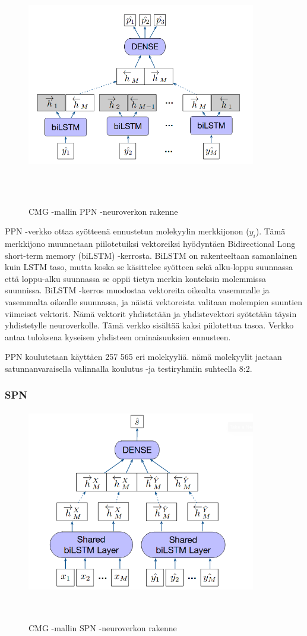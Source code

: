 \documentclass[finnish,twoside,censored,tkt,sw-line]{HYthesisML}
\begin{document}
\begin{figure}[ht]
    \centering
    \includegraphics[width=10cm, height=8cm]{cmg-property-prediction-network.png}
    \caption{CMG -mallin PPN -neuroverkon rakenne}
    {~\cite{ShinBonggun}}
\end{figure}

PPN -verkko ottaa syötteenä ennustetun molekyylin merkkijonon (\(y_i\)).
Tämä merkkijono muunnetaan piilotetuiksi vektoreiksi hyödyntäen Bidirectional Long short-term memory (biLSTM) -kerrosta.
BiLSTM on rakenteeltaan samanlainen kuin LSTM taso, mutta koska se käsittelee syötteen sekä alku-loppu suunnassa että loppu-alku suunnassa se oppii tietyn merkin konteksin molemmissa suunnissa.
BiLSTM -kerros muodostaa vektoreita oikealta vasemmalle ja vasemmalta oikealle suunnassa, ja näistä vektoreista valitaan molempien suuntien viimeiset vektorit.
Nämä vektorit yhdistetään ja yhdistevektori syötetään täysin yhdistetylle neuroverkolle.
Tämä verkko sisältää kaksi piilotettua tasoa.
Verkko antaa tuloksena kyseisen yhdisteen ominaisuuksien ennusteen.

PPN koulutetaan käyttäen 257 565 eri molekyyliä.
nämä molekyylit jaetaan satunnanvaraisella valinnalla koulutus -ja testiryhmiin suhteella 8:2.

\subsubsection{SPN}

\begin{figure}[!h]
    \centering
    \includegraphics[width=10cm, height=8cm]{cmg-similarity-network.png}
    \caption{CMG -mallin SPN -neuroverkon rakenne}
    {~\cite{ShinBonggun}}
\end{figure}
\end{document}
